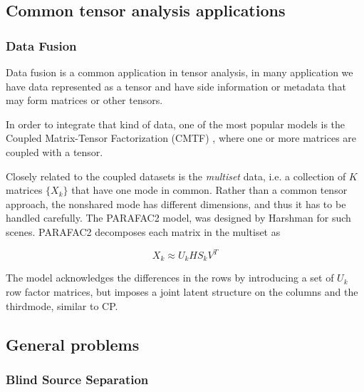 \documentclass[letterpaper,12pt]{article}
\begin{document}
\subsection{Common tensor analysis applications}\label{sec:tensor_apps}


\subsubsection{Data Fusion}

Data fusion is a common application in tensor analysis, in many application we have data represented as a tensor and have side information or metadata that may form matrices or other tensors.

In order to integrate that kind of data, one of the most popular models is the Coupled Matrix-Tensor Factorization (CMTF) \cite{Acar2011}, where one or more matrices are coupled with a tensor.

Closely related to the coupled datasets is the \textit{multiset} data, i.e. a collection of $K$ matrices $\{X_k\}$ that have one mode in common. Rather than a common tensor approach, the nonshared mode has different dimensions, and thus it has to be handled carefully. The PARAFAC2 model, was designed by Harshman \cite{Harshman1970} for such scenes. PARAFAC2 decomposes each matrix in the multiset as

$$X_k\approx U_kHS_kV^T$$

The model acknowledges the differences in the rows by introducing a set of $U_k$ row factor matrices, but imposes a joint latent structure on the columns and the thirdmode, similar to CP.

\subsection{General problems}


 \subsubsection{Blind Source Separation}
 
\end{document}

